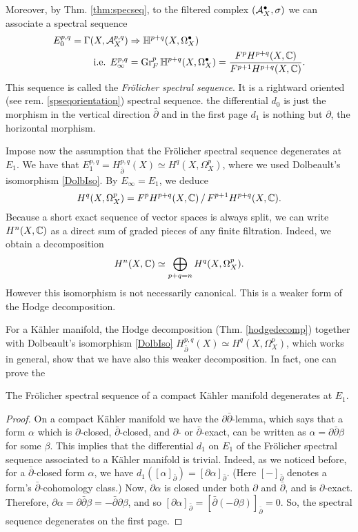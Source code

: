 \documentclass[../main.tex]{subfiles}
\begin{document}
Moreover, by Thm. \ref{thm:specseq}, to the filtered complex $(\mathcal{A}_X^{\bullet},\sigma)$ we can associate a spectral sequence
\begin{align*}
E_0^{p,q} = \Gamma(X,\mathcal{A}_X^{p,q}) &\Rightarrow  \mathbb{H}^{p+q}(X,\Omega_X^{\bullet}) \\
\text{ i.e. } E_\infty^{p,q} &= \operatorname{Gr}_F^p \mathbb{H}^{p+q}(X,\Omega_X^{\bullet}) = \frac{F^pH^{p+q}(X,\mathbb{C})}{F^{p+1}H^{p+q}(X,\mathbb{C})}.
\end{align*}
This sequence is called the 
\emph{Fr\"{o}licher spectral sequence}.
It is a rightward oriented (see rem. \ref{spseqorientation}) spectral sequence. the differential $d_0$ is just the morphism in the vertical direction $\bar \partial$ and in the first page $d_1$ is nothing but $\partial$, the horizontal morphism.

Impose now the assumption that the Fr\"{o}licher spectral sequence degenerates at $E_1$. We have that $E_1^{p,q} = H^{p,q}_{\bar\partial}(X) \simeq H^q(X,\Omega_X^p)$, where we used Dolbeault's isomorphism \ref{DolbIso}. By $E_\infty = E_1$, we deduce
\[
H^q(X,\Omega_X^p) = F^pH^{p+q}(X,\mathbb{C})\, / \, F^{p+1}H^{p+q}(X,\mathbb{C}).
\]
Because a short exact sequence of vector spaces is always split, we can write $H^n(X,\mathbb{C})$ as a direct sum of graded pieces of any finite filtration. Indeed, we obtain a decomposition
\[
H^n(X,\mathbb{C}) \simeq \bigoplus_{p+q=n} H^q (X, \Omega_X^p ).
\]
However this isomorphism is not necessarily canonical. This is a weaker form of the Hodge decomposition. 

For a K\"{a}hler manifold, the Hodge decomposition (Thm. \ref{hodgedecomp}) together with Dolbeault's isomorphism \ref{DolbIso} $H^{p,q}_{\bar\partial}(X) \simeq H^q(X,\Omega^p_X)$, which works in general, show that we have also this weaker decomposition. In fact, one can prove the

\begin{theorem} \textup{\cite[Thm. 8.28]{Voi07}} The Fr\"{o}licher spectral sequence of a compact K\"ahler manifold degenerates at $E_1$.
\end{theorem}
\begin{proof}
    On a compact K\"ahler manifold we have the $\partial \bar \partial$-lemma, which says that a form $\alpha$ which is $\partial$-closed, $\bar \partial$-closed, and $\partial$- or $\bar \partial$-exact, can be written as $\alpha= \partial \bar \partial \beta$ for some $\beta$. This implies that the differential $d_1$ on $E_1$ of the Fr\"{o}licher spectral sequence associated to a K\"ahler manifold is trivial. Indeed, as we noticed before, for a $\bar \partial$-closed form $\alpha$, we have $d_1([ \alpha ]_{\bar \partial} ) = [ \partial \alpha ]_{\bar \partial} $. (Here $[- ]_{\bar \partial}$ denotes a form’s $\bar \partial$-cohomology class.) Now, $\partial\alpha$ is closed under both $\partial$ and $\bar \partial$, and is $ \partial$-exact. Therefore, $\partial\alpha = \partial \bar \partial \beta = - \bar\partial \partial \beta$, and so $[\partial\alpha]_{\bar \partial} = [\bar \partial ( - \partial \beta)]_{\bar \partial} =0$. So, the spectral sequence degenerates on the first page.
\end{proof}
\end{document}
